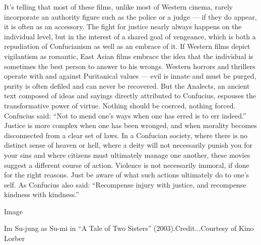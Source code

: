 It's telling that most of these films, unlike most of Western cinema,
rarely incorporate an authority figure such as the police or a judge ---
if they do appear, it is often as an accessory. The fight for justice
nearly always happens on the individual level, but in the interest of a
shared goal of vengeance, which is both a repudiation of Confucianism as
well as an embrace of it. If Western films depict vigilantism as
romantic, East Asian films embrace the idea that the individual is
sometimes the best person to answer to his wrongs. Western horrors and
thrillers operate with and against Puritanical values --- evil is innate
and must be purged, purity is often defiled and can never be recovered.
But the Analects, an ancient text composed of ideas and sayings directly
attributed to Confucius, espouses the transformative power of virtue.
Nothing should be coerced, nothing forced. Confucius said: ``Not to mend
one's ways when one has erred is to err indeed.'' Justice is more
complex when one has been wronged, and when morality becomes
disconnected from a clear set of laws. In a Confucian society, where
there is no distinct sense of heaven or hell, where a deity will not
necessarily punish you for your sins and where citizens must ultimately
manage one another, these movies suggest a different course of action.
Violence is not necessarily immoral, if done for the right reasons. Just
be aware of what such actions ultimately do to one's self. As Confucius
also said: ``Recompense injury with justice, and recompense kindness
with kindness.''

Image

Im Su-jung as Su-mi in ``A Tale of Two Sisters''
(2003).Credit...Courtesy of Kino Lorber

